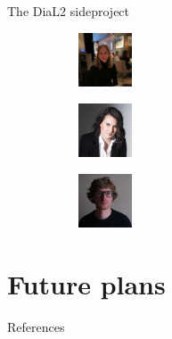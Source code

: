 \documentclass[
  ignorenonframetext,
  t]{beamer}
\newif\ifbibliography
\begin{document}
\begin{frame}{The DiaL2 sideproject}
\label{the-dial2-sideproject-1}
\begin{figure}

\begin{minipage}{0.33\linewidth}

\begin{figure}[H]

{\centering \includegraphics[width=0.63in,height=\textheight]{images/panova.jpeg}

}


\end{figure}%

\end{minipage}%
%
\begin{minipage}{0.33\linewidth}

\begin{figure}[H]

{\centering \includegraphics[width=0.63in,height=\textheight]{images/gich.png}

}


\end{figure}%

\end{minipage}%
%
\begin{minipage}{0.33\linewidth}

\begin{figure}[H]

{\centering \includegraphics[width=0.63in,height=\textheight]{images/moroz.jpeg}

}


\end{figure}%

\end{minipage}%

\end{figure}%
\end{frame}

\section{Future plans}\label{future-plans}


\renewcommand\refname{References}
\begin{frame}[allowframebreaks]{References}
  \bibliographytrue
  
\end{frame}
\end{document}
